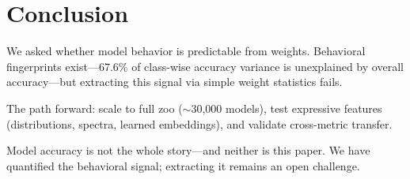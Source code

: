 \section{Conclusion}

We asked whether model behavior is predictable from weights. Behavioral fingerprints exist---67.6\% of class-wise accuracy variance is unexplained by overall accuracy---but extracting this signal via simple weight statistics fails.

The path forward: scale to full zoo ($\sim$30,000 models), test expressive features (distributions, spectra, learned embeddings), and validate cross-metric transfer.

Model accuracy is not the whole story---and neither is this paper. We have quantified the behavioral signal; extracting it remains an open challenge.
